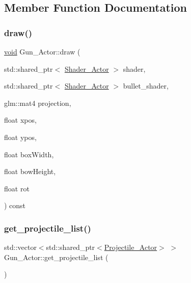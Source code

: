 \subsection{Member Function Documentation}
\mbox{\label{classGun__Actor_a79adbc60417d353f22f0f21653cc0e60}} 
\subsubsection{\texorpdfstring{draw()}{draw()}}
{\footnotesize\ttfamily \hyperlink{imgui__impl__opengl3__loader_8h_ac668e7cffd9e2e9cfee428b9b2f34fa7}{void} Gun\+\_\+\+Actor\+::draw (\begin{DoxyParamCaption}\item[{std\+::shared\+\_\+ptr$<$ \hyperlink{classShader__Actor}{Shader\+\_\+\+Actor} $>$}]{shader,  }\item[{std\+::shared\+\_\+ptr$<$ \hyperlink{classShader__Actor}{Shader\+\_\+\+Actor} $>$}]{bullet\+\_\+shader,  }\item[{glm\+::mat4}]{projection,  }\item[{float}]{xpos,  }\item[{float}]{ypos,  }\item[{float}]{box\+Width,  }\item[{float}]{bow\+Height,  }\item[{float}]{rot }\end{DoxyParamCaption}) const}

\mbox{\label{classGun__Actor_ac24b6aa92132d453ce19eee3c1b0e5e2}} 
\subsubsection{\texorpdfstring{get\+\_\+projectile\+\_\+list()}{get\_projectile\_list()}}
{\footnotesize\ttfamily std\+::vector$<$std\+::shared\+\_\+ptr$<$\hyperlink{classProjectile__Actor}{Projectile\+\_\+\+Actor}$>$ $>$ Gun\+\_\+\+Actor\+::get\+\_\+projectile\+\_\+list (\begin{DoxyParamCaption}{ }\end{DoxyParamCaption})\hspace{0.3cm}{\ttfamily [inline]}}

